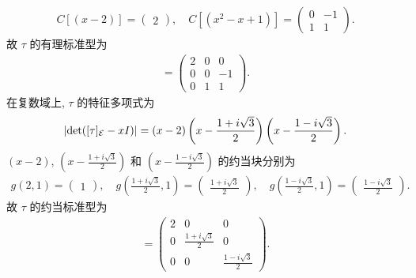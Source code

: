 \documentclass{assignment}
\begin{document}
\begin{sol}
\begin{itemize}
        \begin{align}
            C[(x-2)]=\begin{pmatrix}
                2
            \end{pmatrix},\quad C[(x^2-x+1)]=\begin{pmatrix}
                0&-1\\
                1&1
            \end{pmatrix}.
        \end{align}
        故 $\tau$ 的有理标准型为
        \begin{align}
            [\tau]=\begin{pmatrix}
                2&0&0\\
                0&0&-1\\
                0&1&1
            \end{pmatrix}.
        \end{align}
        在复数域上, $\tau$ 的特征多项式为
        \begin{align}
            \left\lvert\det([\tau]_{\mathcal{E}}-xI)\right\rvert=(x-2)\left(x-\frac{1+i\sqrt{3}}{2}\right)\left(x-\frac{1-i\sqrt{3}}{2}\right).
        \end{align}
        $(x-2)$, $\left(x-\frac{1+i\sqrt{3}}{2}\right)$ 和 $\left(x-\frac{1-i\sqrt{3}}{2}\right)$ 的约当块分别为
        \begin{align}
            g(2,1)=\begin{pmatrix}
                1
            \end{pmatrix},\quad g\left(\frac{1+i\sqrt{3}}{2},1\right)=\begin{pmatrix}
                \frac{1+i\sqrt{3}}{2}
            \end{pmatrix},\quad g\left(\frac{1-i\sqrt{3}}{2},1\right)=\begin{pmatrix}
                \frac{1-i\sqrt{3}}{2}
            \end{pmatrix}.
        \end{align}
        故 $\tau$ 的约当标准型为
        \begin{align}
            [\tau]=\begin{pmatrix}
                2&0&0\\
                0&\frac{1+i\sqrt{3}}{2}&0\\
                0&0&\frac{1-i\sqrt{3}}{2}
            \end{pmatrix}.
        \end{align}
    \end{itemize}
\end{sol}
\end{document}
